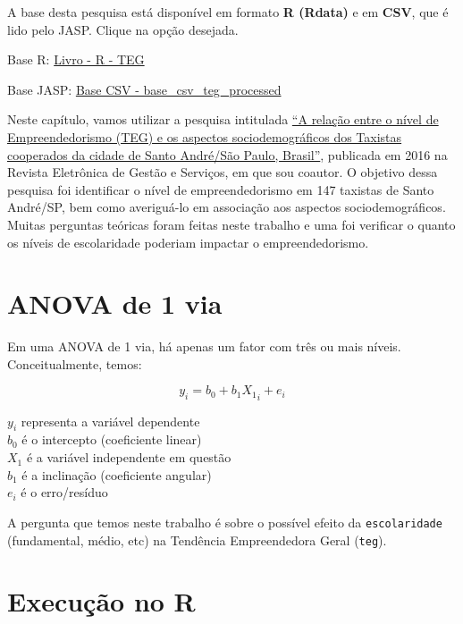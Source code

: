 \documentclass[
]{book}
\newenvironment{base}{
  \definecolor{shadecolor}{rgb}{0.972,0.972,0.972}  %
  \color{black}
  \begin{shaded}}
 {\end{shaded}}
\begin{document}
\begin{base}
A base desta pesquisa está disponível em formato \textbf{R (Rdata)} e em \textbf{CSV}, que é lido pelo JASP. Clique na opção desejada.

Base R: \href{https://github.com/anovabr/mqt/raw/master/bases/Livro\%20-\%20R\%20-\%20TEG.RData}{Livro - R - TEG}

Base JASP: \href{https://github.com/anovabr/mqt/raw/master/bases/bases_csv_jasp.zip}{Base CSV - base\_csv\_teg\_processed}

\end{base}

Neste capítulo, vamos utilizar a pesquisa intitulada \href{https://www.metodista.br/revistas/revistas-metodista/index.php/REGS/article/view/6453}{``A relação entre o nível de Empreendedorismo (TEG) e os aspectos sociodemográficos dos Taxistas cooperados da cidade de Santo André/São Paulo, Brasil''}, publicada em 2016 na Revista Eletrônica de Gestão e Serviços, em que sou coautor. O objetivo dessa pesquisa foi identificar o nível de empreendedorismo em 147 taxistas de Santo André/SP, bem como averiguá-lo em associação aos aspectos sociodemográficos. Muitas perguntas teóricas foram feitas neste trabalho e uma foi verificar o quanto os níveis de escolaridade poderiam impactar o empreendedorismo.

\hypertarget{anova-de-1-via}{%
\section{ANOVA de 1 via}\label{anova-de-1-via}}

Em uma ANOVA de 1 via, há apenas um fator com três ou mais níveis. Conceitualmente, temos:

\[y_i = b_0 + b_1X{_1}_i + e_i\]

\(y_i\) representa a variável dependente\\
\(b_0\) é o intercepto (coeficiente linear)\\
\(X_1\) é a variável independente em questão\\
\(b_1\) é a inclinação (coeficiente angular)\\
\(e_i\) é o erro/resíduo

A pergunta que temos neste trabalho é sobre o possível efeito da \texttt{escolaridade} (fundamental, médio, etc) na Tendência Empreendedora Geral (\texttt{teg}).

\hypertarget{execuuxe7uxe3o-no-r-6}{%
\section{Execução no R}\label{execuuxe7uxe3o-no-r-6}}
\end{document}
